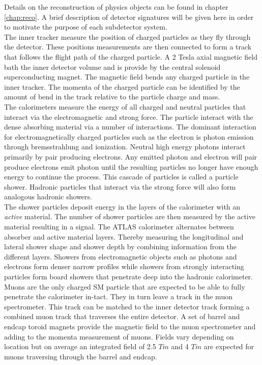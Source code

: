 \indent Details on the reconstruction of physics objects can be found in chapter \ref{chap:reco}.  A brief description of detector signatures will be given here in order to motivate the purpose of each subdetector system. \\

\indent The inner tracker measure the position of charged particles as they fly through the detector.  These positions measurements are then connected to form a track that follows the flight path of the charged particle.  A 2 Tesla axial magnetic field bath the inner detector volume and is provide by the central solenoid superconducting magnet.  The magnetic field bends any charged particle in the inner tracker.  The momenta of the charged particle can be identified by the amount of bend in the track relative to the particle charge and mass.  \\

\indent The calorimeters measure the energy of all charged and neutral particles that interact via the electromagnetic and strong force.  The particle interact with the dense absorbing material via a number of interactions.  The dominant interaction for electromagnetically charged particles such as the electron is photon emission through bremsstrahlung and ionization.  Neutral high energy photons interact primarily by pair producing electrons.  Any emitted photon and electron will pair produce electrons emit photon until the resulting particles no longer have enough energy to continue the process.  This cascade of particles is called a particle shower.  Hadronic particles that interact via the strong force will also form analogous hadronic showers.  \\

\indent The shower particles deposit energy in the layers of the calorimeter with an {\it active} material.  The number of shower particles are then measured by the active material resulting in a signal.  The ATLAS calorimeter alternates between absorber and active material layers.  Thereby measuring the longitudinal and lateral shower shape and shower depth by combining information from the different layers. Showers from electromagnetic objects such as photons and electrons form denser narrow profiles while showers from strongly interacting particles form board showers that penetrate deep into the hadronic calorimeter. \\

\indent Muons are the only charged SM particle that are expected to be able to fully penetrate the calorimeter in-tact.  They in turn leave a track in the muon spectrometer.  This track can be matched to the inner detector track forming a combined muon track that traverses the entire detector.  A set of barrel and endcap toroid magnets provide the magnetic field to the muon spectrometer and adding to the momenta measurement of muons.  Fields vary depending on location but on average an integrated field of 2.5 $T \dot m$ and 4 $T \dot m$ are expected for muons traversing through the barrel and endcap.\\

